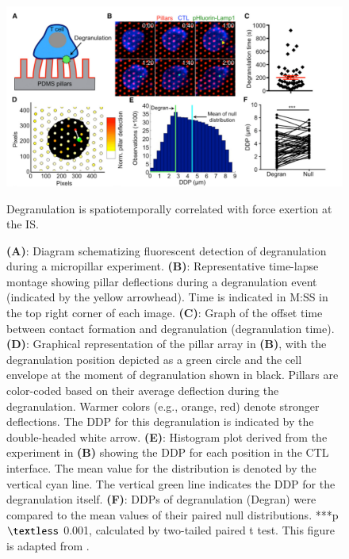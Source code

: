 \begin{figure}[htbp]
	\centering
	\includegraphics[width=\textwidth]{../figures/chapter3/introddp.png}
	\caption{Degranulation is spatiotemporally correlated with force exertion at the IS.}
	\caption*{\textbf{(A)}: Diagram schematizing fluorescent detection of degranulation during a micropillar experiment. \textbf{(B)}: Representative time-lapse montage showing pillar deflections during a degranulation event (indicated by the yellow arrowhead). Time is indicated in M:SS in the top right corner of each image. \textbf{(C)}: Graph of the offset time between contact formation and degranulation (degranulation time).  \textbf{(D)}: Graphical representation of the pillar array in \textbf{(B)}, with the degranulation position depicted as a green circle and the cell envelope at the moment of degranulation shown in black. Pillars are color-coded based on their average deflection during the degranulation. Warmer colors (e.g., orange, red) denote stronger deflections. The DDP for this degranulation is indicated by the double-headed white arrow. \textbf{(E)}: Histogram plot derived from the experiment in \textbf{(B)} showing the DDP for each position in the CTL interface. The mean value for the distribution is denoted by the vertical cyan line. The vertical green line indicates the DDP for the degranulation itself.  \textbf{(F)}: DDPs of degranulation (Degran) were compared to the mean values of their paired null distributions. ***p $\textless$ 0.001, calculated by two-tailed paired t test.  This figure is adapted from \cite{Basu2016}.}
	\label{fig:introddp}
\end{figure}

